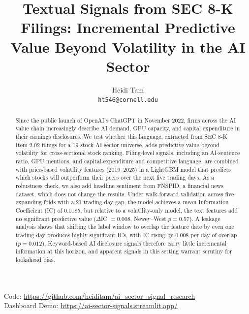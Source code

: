 \documentclass[10pt,letterpaper,twocolumn]{article}
\title{Textual Signals from SEC 8-K Filings: Incremental Predictive Value Beyond Volatility in the AI Sector}
\author{
  Heidi Tam \\
  {\tt ht546@cornell.edu}
}
\begin{document}
\maketitle


\begin{abstract}
Since the public launch of OpenAI's ChatGPT in November 2022, firms across the AI value chain increasingly describe AI demand, GPU capacity, and capital expenditure in their earnings disclosures. We test whether this language, extracted from SEC 8-K Item 2.02 filings for a 19-stock AI-sector universe, adds predictive value beyond volatility for cross-sectional stock ranking. Filing-level signals, including an AI-sentence ratio, GPU mentions, and capital-expenditure and competitive language, are combined with price-based volatility features (2019--2025) in a LightGBM model that predicts which stocks will outperform their peers over the next five trading days. As a robustness check, we also add headline sentiment from FNSPID, a financial news dataset, which does not change the results. Under walk-forward validation across five expanding folds with a 21-trading-day gap, the model achieves a mean Information Coefficient (IC) of 0.0185, but relative to a volatility-only model, the text features add no significant predictive value ($\Delta$IC $= 0.008$, Newey--West $p = 0.57$). A leakage analysis shows that shifting the label window to overlap the feature date by even one trading day produces highly significant ICs, with IC rising by 0.008 per day of overlap ($p = 0.012$). Keyword-based AI disclosure signals therefore carry little incremental information at this horizon, and apparent signals in this setting warrant scrutiny for lookahead bias.
\end{abstract}

\begin{center}
Code: \url{https://github.com/heiditam/ai_sector_signal_research}\\
Dashboard Demo: \url{https://ai-sector-signals.streamlit.app/}
\end{center}


\end{document}
